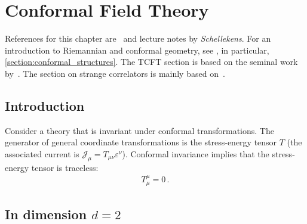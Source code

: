\chapter{Conformal Field Theory}\label{chapter:cft}

    References for this chapter are~\citet{schottenloher_mathematical_2008,gui_lectures_2023,fuchs_algebraic_2023} and lecture notes by \textit{Schellekens}. For an introduction to Riemannian and conformal geometry, see , in particular, \cref{section:conformal_structures}. The TCFT section is based on the seminal work by~\citet{fuchs_tft_2002,fuchs_tft_2004,fuchs_tft_2004-1,fuchs_tft_2005,fjelstad_tft_2005}. The section on strange correlators is mainly based on~\citet{vanhove_mapping_2018,you_wave_2014}.

    \minitoc

\section{Introduction}

    \begin{property}
        Consider a theory that is invariant under conformal transformations. The generator of general coordinate transformations is the stress-energy tensor $T$ (the associated current is $\mathcal{J}_\mu = T_{\mu\nu}\varepsilon^\nu$). Conformal invariance implies that the stress-energy tensor is traceless:
        \begin{gather}
            T^\mu_\mu = 0\,.
        \end{gather}
    \end{property}


\section{\texorpdfstring{In dimension $d=2$}{In dimension d=2}}

